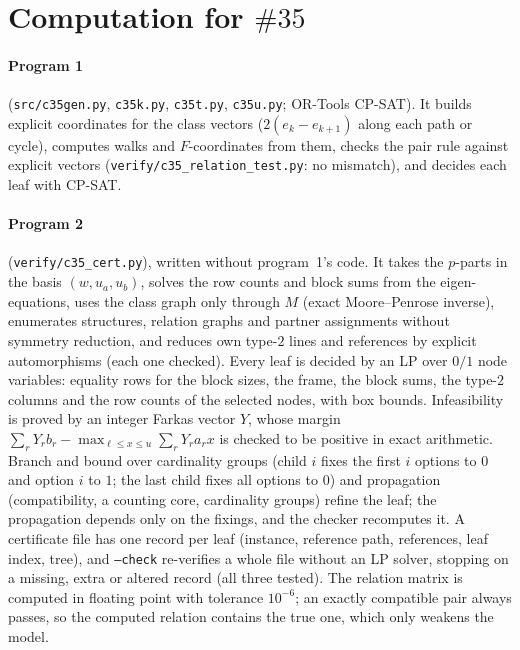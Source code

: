 \documentclass[11pt]{article}
\theoremstyle{definition}
\begin{document}
\section{\texorpdfstring{Computation for $\#35$}{Computation for \#35}}\label{sec:comp35}

\paragraph{Program 1} (\texttt{src/c35gen.py}, \texttt{c35k.py}, \texttt{c35t.py}, \texttt{c35u.py};
OR-Tools CP-SAT). It builds explicit coordinates for the class vectors ($2(e_k-e_{k+1})$ along each path or
cycle), computes walks and $F$-coordinates from them, checks the pair rule against explicit vectors
(\texttt{verify/c35\_relation\_test.py}: no mismatch), and decides each leaf with CP-SAT.

\paragraph{Program 2} (\texttt{verify/c35\_cert.py}), written without program~1's code. It takes the
$p$-parts in the basis $(w,u_a,u_b)$, solves the row counts and block sums from the eigen-equations,
uses the class graph only through $M$ (exact Moore--Penrose inverse), enumerates structures, relation
graphs and partner assignments without symmetry reduction, and reduces own type-$2$ lines and
references by explicit automorphisms (each one checked). Every leaf is decided by an LP over $0/1$ node
variables: equality rows for the block sizes, the frame, the block sums, the type-$2$ columns and the row
counts of the selected nodes, with box bounds. Infeasibility is proved by an integer Farkas vector $Y$,
whose margin $\sum_rY_rb_r-\max_{\ell\le x\le u}\sum_rY_ra_rx$ is checked to be positive in exact
arithmetic. Branch and bound over cardinality groups (child $i$ fixes the first $i$ options to $0$ and
option $i$ to $1$; the last child fixes all options to $0$) and propagation (compatibility, a counting
core, cardinality groups) refine the leaf; the propagation depends only on the fixings, and the checker
recomputes it. A certificate file has one record per leaf (instance, reference path, references, leaf
index, tree), and \texttt{--check} re-verifies a whole file without an LP solver, stopping on a missing,
extra or altered record (all three tested). The relation matrix is computed in floating point with
tolerance $10^{-6}$; an exactly compatible pair always passes, so the computed relation contains the true
one, which only weakens the model.
\end{document}
